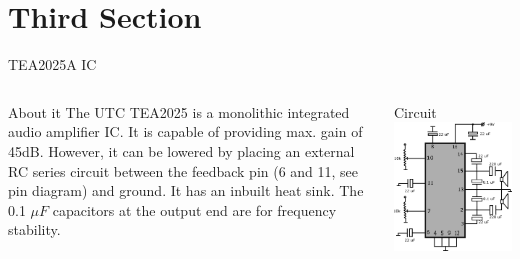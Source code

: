 \documentclass{beamer}
\begin{document}
\section*{Third Section}
\begin{frame}{TEA2025A IC}
\begin{columns}
\begin{column}{0.4\textwidth}
\begin{block}{About it}
The UTC TEA2025 is a monolithic integrated audio amplifier IC. It is capable of providing max. gain of 45dB. However, it can be lowered by placing an external RC series circuit between the feedback pin (6 and 11, see pin diagram) and ground. It has an inbuilt heat sink. The 0.1 $\mu F$ capacitors at the output end are for frequency stability. \end{block}
\end{column}

\begin{column}{0.4\textwidth}
\begin{block}{Circuit}
\includegraphics[width=\columnwidth]{text7088.png} \end{block}
\end{column}
\end{columns}
\end{frame}
\end{document}
